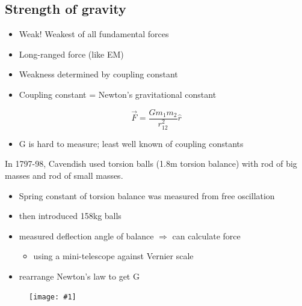 \documentclass[a4paper]{article} %
\renewcommand{\picture}[1]
{
\begin{figure}[h]
\centering
\texttt{[image: \#1]}
\end{figure}
}
\begin{document}
\subsection{Strength of gravity}
\begin{itemize}
\item Weak! Weakest of all fundamental forces
\item Long-ranged force (like EM)
\item Weakness determined by coupling constant
\item Coupling constant = Newton's gravitational constant
\end{itemize}
\begin{equation}
\vec{F}=\frac{Gm_1 m_2}{r_{12}^2}\hat{r}
\end{equation}
\begin{itemize}
\item G is hard to measure; least well known of coupling constants
\end{itemize}
In 1797-98, Cavendish used torsion balls (1.8m torsion balance) with rod of big masses and rod of small masses. 
\begin{itemize}
\item Spring constant of torsion balance was measured from free oscillation
\item then introduced 158kg balls
\item measured deflection angle of balance $\Rightarrow$ can calculate force
\begin{itemize}
\item using a mini-telescope against Vernier scale
\end{itemize}
\item rearrange Newton's law to get G
\end{itemize}

\picture{images/cavendish-torsion-balance.png}
 
\end{document}
